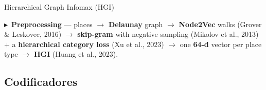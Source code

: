\documentclass{beamer}
\begin{document}
\begin{frame}{Hierarchical Graph Infomax (HGI)}
{    %
    \textcolor{primary}{$\blacktriangleright$}~\textbf{Preprocessing} --- places $\to$
    \textbf{Delaunay} graph $\to$ \textbf{Node2Vec} walks {\scriptsize(Grover \& Leskovec, 2016)}
    $\to$ \textbf{skip-gram} with negative sampling {\scriptsize(Mikolov et al., 2013)} $+$ a
    \textbf{hierarchical category loss} {\scriptsize(Xu et al., 2023)} $\to$ one \textbf{64-d}
    vector per place type $\to$ \textbf{HGI} {\scriptsize(Huang et al., 2023)}.\par}
    \leftskip=0pt \parindent=0pt
\end{frame}

\subsection{Codificadores}
\end{document}
